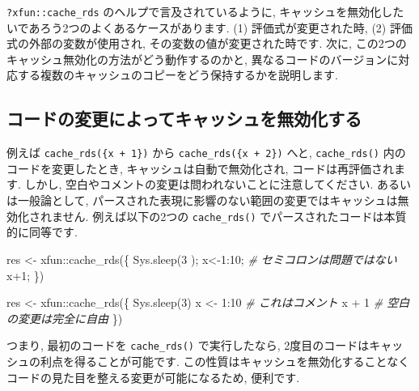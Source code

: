 \documentclass[
  11pt,
]{bxjsreport}
\newenvironment{Shaded}{\begin{snugshade}}{\end{snugshade}}
\newcommand{\CommentTok}[1]{\textcolor[rgb]{0.56,0.35,0.01}{\textit{#1}}}
\newcommand{\DecValTok}[1]{\textcolor[rgb]{0.00,0.00,0.81}{#1}}
\newcommand{\FunctionTok}[1]{\textcolor[rgb]{0.00,0.00,0.00}{#1}}
\newcommand{\NormalTok}[1]{#1}
\newcommand{\OtherTok}[1]{\textcolor[rgb]{0.56,0.35,0.01}{#1}}
\newcommand{\SpecialCharTok}[1]{\textcolor[rgb]{0.00,0.00,0.00}{#1}}
\begin{document}
\texttt{?xfun::cache\_rds} のヘルプで言及されているように, キャッシュを無効化したいであろう2つのよくあるケースがあります. (1) 評価式が変更された時, (2) 評価式の外部の変数が使用され, その変数の値が変更された時です. 次に, この2つのキャッシュ無効化の方法がどう動作するのかと, 異なるコードのバージョンに対応する複数のキャッシュのコピーをどう保持するかを説明します.

\hypertarget{ux30b3ux30fcux30c9ux306eux5909ux66f4ux306bux3088ux3063ux3066ux30adux30e3ux30c3ux30b7ux30e5ux3092ux7121ux52b9ux5316ux3059ux308b}{%
\subsection{コードの変更によってキャッシュを無効化する}\label{ux30b3ux30fcux30c9ux306eux5909ux66f4ux306bux3088ux3063ux3066ux30adux30e3ux30c3ux30b7ux30e5ux3092ux7121ux52b9ux5316ux3059ux308b}}

例えば \texttt{cache\_rds(\{x + 1\})} から \texttt{cache\_rds(\{x + 2\})} へと, \texttt{cache\_rds()} 内のコードを変更したとき, キャッシュは自動で無効化され, コードは再評価されます. しかし, 空白やコメントの変更は問われないことに注意してください. あるいは一般論として, パースされた表現に影響のない範囲の変更ではキャッシュは無効化されません. 例えば以下の2つの \texttt{cache\_rds()} でパースされたコードは本質的に同等です.

\begin{Shaded}
\begin{Highlighting}[]
\NormalTok{res }\OtherTok{\textless{}{-}}\NormalTok{ xfun}\SpecialCharTok{::}\FunctionTok{cache\_rds}\NormalTok{(\{}
  \FunctionTok{Sys.sleep}\NormalTok{(}\DecValTok{3}\NormalTok{  );}
\NormalTok{  x}\OtherTok{\textless{}{-}}\DecValTok{1}\SpecialCharTok{:}\DecValTok{10}\NormalTok{;  }\CommentTok{\# セミコロンは問題ではない}
\NormalTok{  x}\SpecialCharTok{+}\DecValTok{1}\NormalTok{;}
\NormalTok{\})}

\NormalTok{res }\OtherTok{\textless{}{-}}\NormalTok{ xfun}\SpecialCharTok{::}\FunctionTok{cache\_rds}\NormalTok{(\{}
  \FunctionTok{Sys.sleep}\NormalTok{(}\DecValTok{3}\NormalTok{)}
\NormalTok{  x }\OtherTok{\textless{}{-}} \DecValTok{1}\SpecialCharTok{:}\DecValTok{10}  \CommentTok{\# これはコメント}
\NormalTok{  x }\SpecialCharTok{+}
    \DecValTok{1}  \CommentTok{\# 空白の変更は完全に自由}
\NormalTok{\})}
\end{Highlighting}
\end{Shaded}

つまり, 最初のコードを \texttt{cache\_rds()} で実行したなら, 2度目のコードはキャッシュの利点を得ることが可能です. この性質はキャッシュを無効化することなくコードの見た目を整える変更が可能になるため, 便利です.
\end{document}
